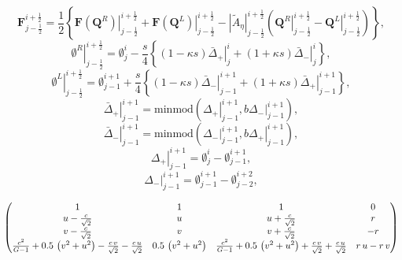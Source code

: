\begin{equation}
 \bm{F}^{i+\frac{1}{2}}_{j-\frac{1}{2}} =
  \frac{1}{2}\left\{\left.\bm{F}(\bm{Q}^R)\right|^{i+\frac{1}{2}}_{j-\frac{1}{2}} +
	     \left.\bm{F}(\bm{Q}^L)\right|^{i+\frac{1}{2}}_{j-\frac{1}{2}} -
	     \left|\tilde{A}_\eta\right|^{i+\frac{1}{2}}_{j-\frac{1}{2}}
	     \left(\left.\bm{Q}^R\right|^{i+\frac{1}{2}}_{j-\frac{1}{2}} -
	     \left.\bm{Q}^L\right|^{i+\frac{1}{2}}_{j-\frac{1}{2}}\right)\right\},
\end{equation}
\begin{equation}
 \left.\emptyset^R\right|^{i+\frac{1}{2}}_{j-\frac{1}{2}} = \emptyset^{i}_{j}
  - \frac{s}{4}\left\{(1-\kappa	s)\left.\bar{\Delta}_+\right|^{i}_{j} +
	       (1+\kappa s)\left.\bar{\Delta}_-\right|^{i}_{j}\right\},
\end{equation}
\begin{equation}
 \left.\emptyset^L\right|^{i+\frac{1}{2}}_{j-\frac{1}{2}} = \emptyset^{i+1}_{j-1}
  + \frac{s}{4}\left\{(1-\kappa	s)\left.\bar{\Delta}_-\right|^{i+1}_{j-1} +
		(1+\kappa s)\left.\bar{\Delta}_+\right|^{i+1}_{j-1}\right\},
\end{equation}
\begin{equation}
 \left.\bar{\Delta}_+\right|^{i+1}_{j-1} = \text{minmod} 
  \left(\left.\Delta_+\right|^{i+1}_{j-1}, b\left.\Delta_-\right|^{i+1}_{j-1}\right),
\end{equation}
\begin{equation}
 \left.\bar{\Delta}_-\right|^{i+1}_{j-1} = \text{minmod} 
  \left(\left.\Delta_-\right|^{i+1}_{j-1}, b\left.\Delta_+\right|^{i+1}_{j-1}\right),
\end{equation}
\begin{equation}
 \left.\Delta_+\right|^{i+1}_{j-1} = \emptyset^{i}_{j} - \emptyset^{i+1}_{j-1},
\end{equation}
\begin{equation}
 \left.\Delta_-\right|^{i+1}_{j-1} = \emptyset^{i+1}_{j-1} - \emptyset^{i+2}_{j-2},
\end{equation}




\[\begin{pmatrix}1 & 1 & 1 & 0\cr u-\frac{c}{\sqrt{2}} & u & u+\frac{c}{\sqrt{2}} & r\cr v-\frac{c}{\sqrt{2}} & v & v+\frac{c}{\sqrt{2}} & -r\cr \frac{{c}^{2}}{G-1}+0.5\,\left( {v}^{2}+{u}^{2}\right) -\frac{c\,v}{\sqrt{2}}-\frac{c\,u}{\sqrt{2}} & 0.5\,\left( {v}^{2}+{u}^{2}\right)  & \frac{{c}^{2}}{G-1}+0.5\,\left( {v}^{2}+{u}^{2}\right) +\frac{c\,v}{\sqrt{2}}+\frac{c\,u}{\sqrt{2}} & r\,u-r\,v\end{pmatrix}\]